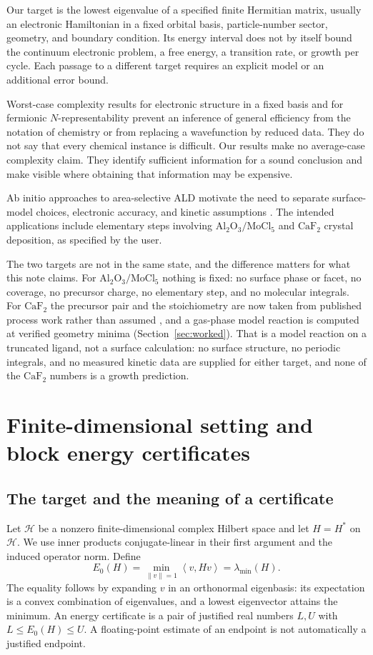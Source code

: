 \documentclass[11pt,a4paper]{article}
\theoremstyle{plain}
\theoremstyle{definition}
\theoremstyle{remark}
\newcommand{\norm}[1]{\left\lVert #1\right\rVert}
\newcommand{\ip}[2]{\left\langle #1,#2\right\rangle}
\begin{document}
Our target is the lowest eigenvalue of a specified finite Hermitian matrix,
usually an electronic Hamiltonian in a fixed orbital basis, particle-number
sector, geometry, and boundary condition. Its energy interval does not by
itself bound the continuum electronic problem, a free energy, a transition
rate, or growth per cycle. Each passage to a different target requires an
explicit model or an additional error bound.

Worst-case complexity results for electronic structure in a fixed basis
\citep{OGorman2022} and for fermionic $N$-representability \citep{Liu2007}
prevent an inference of general efficiency from the notation of chemistry or
from replacing a wavefunction by reduced data. They do not say that every
chemical instance is difficult. Our results make no average-case complexity
claim. They identify sufficient information for a sound conclusion and make
visible where obtaining that information may be expensive.

Ab initio approaches to area-selective ALD motivate the need to separate
surface-model choices, electronic accuracy, and kinetic assumptions
\citep{Pieck2025}. The intended applications include elementary steps involving
$\mathrm{Al_2O_3}/\mathrm{MoCl_5}$ and $\mathrm{CaF_2}$ crystal deposition, as
specified by the user.

The two targets are not in the same state, and the difference matters for what
this note claims. For $\mathrm{Al_2O_3}/\mathrm{MoCl_5}$ nothing is fixed: no
surface phase or facet, no coverage, no precursor charge, no elementary step, and
no molecular integrals. For $\mathrm{CaF_2}$ the precursor pair and the
stoichiometry are now taken from published process work rather than assumed
\citep{Hennessy2023}, and a gas-phase model reaction is computed at verified
geometry minima (Section~\ref{sec:worked}). That is a model reaction on a
truncated ligand, not a surface calculation: no surface structure, no periodic
integrals, and no measured kinetic data are supplied for either target, and none
of the $\mathrm{CaF_2}$ numbers is a growth prediction.

\section{Finite-dimensional setting and block energy certificates}
\label{sec:energy}
\subsection{The target and the meaning of a certificate}
Let $\mathcal H$ be a nonzero finite-dimensional complex Hilbert space and
let $H=H^*$ on $\mathcal H$. We use inner products conjugate-linear in their
first argument and the induced operator norm. Define
\[
 E_0(H)=\min_{\norm{v}=1}\ip{v}{Hv}=\lambda_{\min}(H).
\]
The equality follows by expanding $v$ in an orthonormal eigenbasis: its
expectation is a convex combination of eigenvalues, and a lowest eigenvector
attains the minimum. An energy certificate is a pair of justified real
numbers $L,U$ with $L\le E_0(H)\le U$. A floating-point estimate of an
endpoint is not automatically a justified endpoint.
\end{document}
